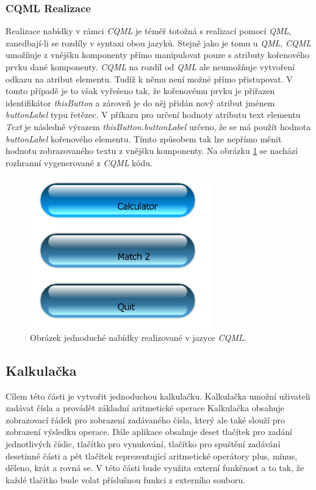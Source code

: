 \documentclass[11pt,twoside,a4paper]{book}
\begin{document}
\subsubsection{\label{SEC:CQMLMenu}CQML Realizace}
Realizace nabídky v rámci \textit{CQML} je téměř totožná s realizací pomocí \textit{QML}, zanedbají-li se rozdíly v syntaxi obou jazyků.
Stejně jako je tomu u \textit{QML}, \textit{CQML} umožňuje z vnějšku komponenty přímo manipulovat pouze s atributy kořenového prvku dané komponenty. \textit{CQML} na rozdíl od \textit{QML} ale neumožňuje vytvoření odkazu na atribut elementu. Tudíž k němu není možné přímo přistupovat.  V tomto případě je to však vyřešeno tak, že kořenovému prvku je přiřazen identifikátor \textit{thisButton} a zároveň je do něj přidán nový atribut jménem \textit{buttonLabel} typu řetězec. V příkazu pro určení hodnoty atributu text elementu \textit{Text} je následně výrazem \textit{thisButton.buttonLabel} určeno, že se má použít hodnota \textit{buttonLabel} kořenového elementu. Tímto způsobem tak lze nepřímo měnit hodnotu zobrazovaného textu z vnějšku komponenty. Na obrázku \ref{fig:outMenuCQML} se nachází rozhranní vygenerované z \textit{CQML} kódu.
\begin{figure}[!ht]
\begin{center}
  \includegraphics[width=0.7\textwidth]{cqmlMenu}
\caption{{\label{fig:outMenuCQML}}Obrázek jednoduché nabídky realizované v jazyce \textit{CQML}.}
\end{center}
\end{figure}

\subsection{Kalkulačka}
Cílem této části je vytvořit jednoduchou kalkulačku. Kalkulačka umožní uživateli zadávat čísla a provádět základní aritmetické operace Kalkulačka obsahuje zobrazovací řádek pro zobrazení zadávaného čísla, který ale také slouží pro zobrazení výsledku operace. Dále aplikace obsahuje deset tlačítek pro zadání jednotlivých číslic, tlačítko pro vynulování, tlačítko pro spuštění zadávání desetinné části a pět tlačítek reprezentující aritmetické operátory plus, mínus, děleno, krát a rovná se. V této části bude využita externí funkčnost a to tak, že každé tlačítko bude volat příslušnou funkci z externího souboru.
\end{document}
